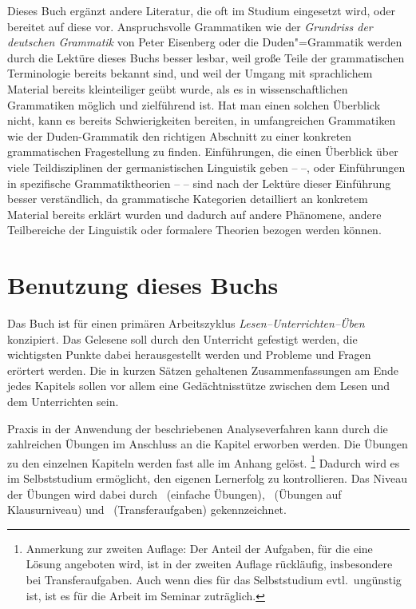 Dieses Buch ergänzt andere Literatur, die oft im Studium eingesetzt wird, oder bereitet auf diese vor.
Anspruchsvolle Grammatiken wie der \textit{Grundriss der deutschen Grammatik} von Peter Eisenberg \citep{Eisenberg1,Eisenberg2} oder die Duden"=Grammatik \citep{Duden8} werden durch die Lektüre dieses Buchs besser lesbar, weil große Teile der grammatischen Terminologie bereits bekannt sind, und weil der Umgang mit sprachlichem Material bereits kleinteiliger geübt wurde, als es in wissenschaftlichen Grammatiken möglich und zielführend ist.
Hat man einen solchen Überblick nicht, kann es bereits Schwierigkeiten bereiten, in umfangreichen Grammatiken wie der Duden-Grammatik den richtigen Abschnitt zu einer konkreten grammatischen Fragestellung zu finden.
Einführungen, die einen Überblick über viele Teildisziplinen der germanistischen Linguistik geben -- \zB \citealp{EgL07,SgL07} --, oder Einführungen in spezifische Grammatiktheorien -- \zB \citealp{Grewendorf02, Mueller08, Sternefeld2008, Sternefeld2009} -- sind nach der Lektüre dieser Einführung besser verständlich, da grammatische Kategorien detailliert an konkretem Material bereits erklärt wurden und dadurch auf andere Phänomene, andere Teilbereiche der Linguistik oder formalere Theorien bezogen werden können.

\section*{Benutzung dieses Buchs}

Das Buch ist für einen primären Arbeitszyklus \textit{Lesen--Unterrichten--Üben} konzipiert.
Das Gelesene soll durch den Unterricht gefestigt werden, die wichtigsten Punkte dabei herausgestellt werden und Probleme und Fragen erörtert werden.
Die in kurzen Sätzen gehaltenen Zusammenfassungen am Ende jedes Kapitels sollen vor allem eine Gedächtnisstütze zwischen dem Lesen und dem Unterrichten sein.

Praxis in der Anwendung der beschriebenen Analyseverfahren kann durch die zahlreichen Übungen im Anschluss an die Kapitel erworben werden.
Die Übungen zu den einzelnen Kapiteln werden fast alle im Anhang gelöst.%
\footnote{Anmerkung zur zweiten Auflage:
Der Anteil der Aufgaben, für die eine Lösung angeboten wird, ist in der zweiten Auflage rückläufig, insbesondere bei Transferaufgaben.
Auch wenn dies für das Selbststudium evtl.\ ungünstig ist, ist es für die Arbeit im Seminar zuträglich.}
Dadurch wird es im Selbststudium ermöglicht, den eigenen Lernerfolg zu kontrollieren.
Das Niveau der Übungen wird dabei durch \onestar\ (einfache Übungen), \twostar\ (Übungen auf Klausurniveau) und \tristar\ (Transferaufgaben) gekennzeichnet.

